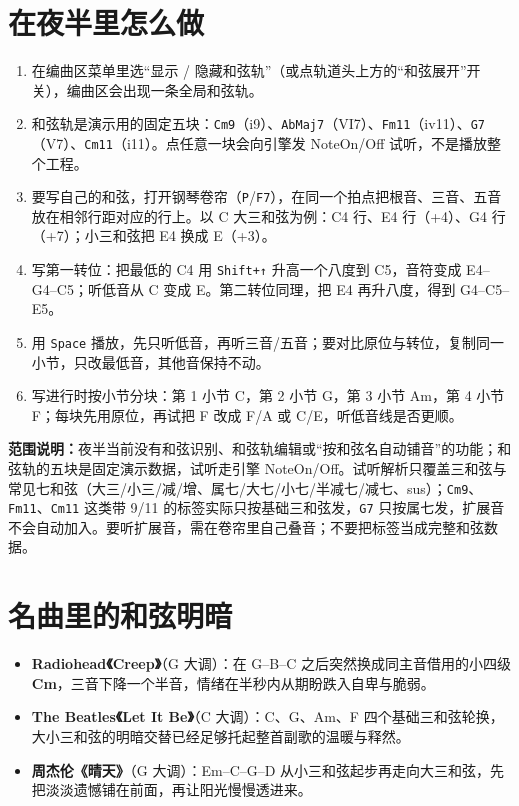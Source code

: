 \section{在夜半里怎么做}

\begin{enumerate}
  \item 在编曲区菜单里选“显示 / 隐藏和弦轨”（或点轨道头上方的“和弦展开”开关），编曲区会出现一条全局和弦轨。
  \item 和弦轨是演示用的固定五块：\texttt{Cm9}（i9）、\texttt{AbMaj7}（VI7）、\texttt{Fm11}（iv11）、\texttt{G7}（V7）、\texttt{Cm11}（i11）。点任意一块会向引擎发 NoteOn/Off 试听，不是播放整个工程。
  \item 要写自己的和弦，打开钢琴卷帘（\texttt{P}/\texttt{F7}），在同一个拍点把根音、三音、五音放在相邻行距对应的行上。以 C 大三和弦为例：C4 行、E4 行（+4）、G4 行（+7）；小三和弦把 E4 换成 E（+3）。
  \item 写第一转位：把最低的 C4 用 \texttt{Shift+↑} 升高一个八度到 C5，音符变成 E4–G4–C5；听低音从 C 变成 E。第二转位同理，把 E4 再升八度，得到 G4–C5–E5。
  \item 用 \texttt{Space} 播放，先只听低音，再听三音/五音；要对比原位与转位，复制同一小节，只改最低音，其他音保持不动。
  \item 写进行时按小节分块：第 1 小节 C，第 2 小节 G，第 3 小节 Am，第 4 小节 F；每块先用原位，再试把 F 改成 F/A 或 C/E，听低音线是否更顺。
\end{enumerate}


\textbf{范围说明：}夜半当前没有和弦识别、和弦轨编辑或“按和弦名自动铺音”的功能；和弦轨的五块是固定演示数据，试听走引擎 NoteOn/Off。试听解析只覆盖三和弦与常见七和弦（大三/小三/减/增、属七/大七/小七/半减七/减七、sus）；\texttt{Cm9}、\texttt{Fm11}、\texttt{Cm11} 这类带 9/11 的标签实际只按基础三和弦发，\texttt{G7} 只按属七发，扩展音不会自动加入。要听扩展音，需在卷帘里自己叠音；不要把标签当成完整和弦数据。

\section{名曲里的和弦明暗}

\begin{itemize}
  \item \textbf{Radiohead《Creep》}（G 大调）：在 G--B--C 之后突然换成同主音借用的小四级 \textbf{Cm}，三音下降一个半音，情绪在半秒内从期盼跌入自卑与脆弱。
  \item \textbf{The Beatles《Let It Be》}（C 大调）：C、G、Am、F 四个基础三和弦轮换，大小三和弦的明暗交替已经足够托起整首副歌的温暖与释然。
  \item \textbf{周杰伦《晴天》}（G 大调）：Em--C--G--D 从小三和弦起步再走向大三和弦，先把淡淡遗憾铺在前面，再让阳光慢慢透进来。
\end{itemize}

